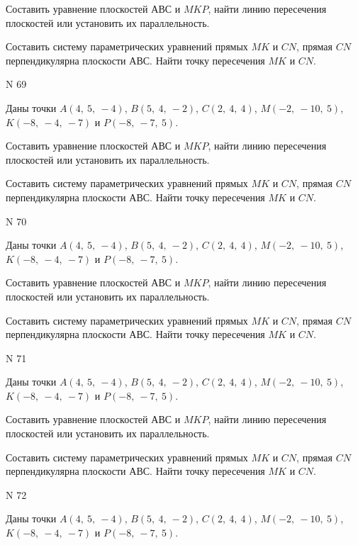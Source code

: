 \documentclass[11pt]{report}
\begin{document}
Составить уравнение плоскостей $АВС$ и $MKP$,
найти линию пересечения плоскостей или установить их параллельность.

Составить систему параметрических уравнений прямых $MK$ и $CN$,
прямая $CN$ перпендикулярна плоскости $АВС$. 
Найти точку пересечения $MK$ и $CN$.



 N 69

Даны точки $A\left( 4, \  5, \  -4\right)$, $B\left( 5, \  4, \  -2\right)$, $C\left( 2, \  4, \  4\right)$, $M\left( -2, \  -10, \  5\right)$, $K\left( -8, \  -4, \  -7\right)$ и $P\left( -8, \  -7, \  5\right)$.


Составить уравнение плоскостей $АВС$ и $MKP$,
найти линию пересечения плоскостей или установить их параллельность.

Составить систему параметрических уравнений прямых $MK$ и $CN$,
прямая $CN$ перпендикулярна плоскости $АВС$. 
Найти точку пересечения $MK$ и $CN$.



 N 70

Даны точки $A\left( 4, \  5, \  -4\right)$, $B\left( 5, \  4, \  -2\right)$, $C\left( 2, \  4, \  4\right)$, $M\left( -2, \  -10, \  5\right)$, $K\left( -8, \  -4, \  -7\right)$ и $P\left( -8, \  -7, \  5\right)$.


Составить уравнение плоскостей $АВС$ и $MKP$,
найти линию пересечения плоскостей или установить их параллельность.

Составить систему параметрических уравнений прямых $MK$ и $CN$,
прямая $CN$ перпендикулярна плоскости $АВС$. 
Найти точку пересечения $MK$ и $CN$.



 N 71

Даны точки $A\left( 4, \  5, \  -4\right)$, $B\left( 5, \  4, \  -2\right)$, $C\left( 2, \  4, \  4\right)$, $M\left( -2, \  -10, \  5\right)$, $K\left( -8, \  -4, \  -7\right)$ и $P\left( -8, \  -7, \  5\right)$.


Составить уравнение плоскостей $АВС$ и $MKP$,
найти линию пересечения плоскостей или установить их параллельность.

Составить систему параметрических уравнений прямых $MK$ и $CN$,
прямая $CN$ перпендикулярна плоскости $АВС$. 
Найти точку пересечения $MK$ и $CN$.



 N 72

Даны точки $A\left( 4, \  5, \  -4\right)$, $B\left( 5, \  4, \  -2\right)$, $C\left( 2, \  4, \  4\right)$, $M\left( -2, \  -10, \  5\right)$, $K\left( -8, \  -4, \  -7\right)$ и $P\left( -8, \  -7, \  5\right)$.
\end{document}
